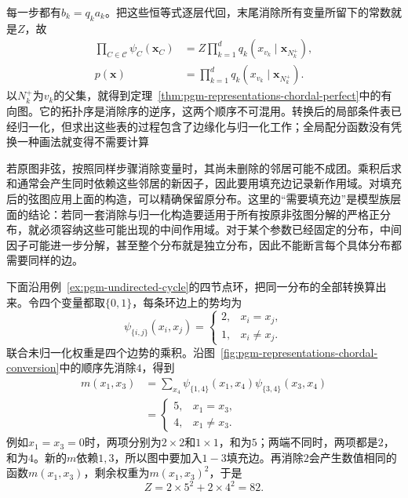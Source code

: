 每一步都有$b_k=q_k a_k$。把这些恒等式逐层代回，末尾消除所有变量所留下的常数就是$Z$，故
\begin{equation}
  \begin{aligned}
    \prod_{C\in\mathcal{C}}\psi_C(\bm{x}_C)
    &=Z\prod_{k=1}^d q_k(x_{v_k}\mid\bm{x}_{N_k^+}),\\
    p(\bm{x})&=\prod_{k=1}^d q_k(x_{v_k}\mid\bm{x}_{N_k^+}).
  \end{aligned}
  \label{eq:pgm-representations-telescoping-product}
\end{equation}
以$N_k^+$为$v_k$的父集，就得到定理~\ref{thm:pgm-representations-chordal-perfect}中的有向图。它的拓扑序是消除序的逆序，这两个顺序不可混用。转换后的局部条件表已经归一化，但求出这些表的过程包含了边缘化与归一化工作；全局配分函数没有凭换一种画法就变得不需要计算

若原图非弦，按照同样步骤消除变量时，其尚未删除的邻居可能不成团。乘积后求和通常会产生同时依赖这些邻居的新因子，因此要用填充边记录新作用域。对填充后的弦图应用上面的构造，可以精确保留原分布。这里的“需要填充边”是模型族层面的结论：若同一套消除与归一化构造要适用于所有按原非弦图分解的严格正分布，就必须容纳这些可能出现的中间作用域。对于某个参数已经固定的分布，中间因子可能进一步分解，甚至整个分布就是独立分布，因此不能断言每个具体分布都需要同样的边。

下面沿用例~\ref{ex:pgm-undirected-cycle}的四节点环，把同一分布的全部转换算出来。令四个变量都取$\{0,1\}$，每条环边上的势均为
\begin{equation}
  \psi_{\{i,j\}}(x_i,x_j)=
  \begin{cases}
    2,&x_i=x_j,\\
    1,&x_i\ne x_j.
  \end{cases}
  \label{eq:pgm-representations-cycle-potentials}
\end{equation}
联合未归一化权重是四个边势的乘积。沿图~\ref{fig:pgm-representations-chordal-conversion}中的顺序先消除$4$，得到
\begin{equation}
  \begin{aligned}
    m(x_1,x_3)
    &=\sum_{x_4}\psi_{\{1,4\}}(x_1,x_4)
    \psi_{\{3,4\}}(x_3,x_4)\\
    &=
    \begin{cases}
      5,&x_1=x_3,\\
      4,&x_1\ne x_3.
    \end{cases}
  \end{aligned}
  \label{eq:pgm-representations-cycle-message}
\end{equation}
例如$x_1=x_3=0$时，两项分别为$2\times2$和$1\times1$，和为$5$；两端不同时，两项都是$2$，和为$4$。新的$m$依赖$1,3$，所以图中要加入$1-3$填充边。再消除$2$会产生数值相同的函数$m(x_1,x_3)$，剩余权重为$m(x_1,x_3)^2$，于是
\[
  Z=2\times5^2+2\times4^2=82.
\]

